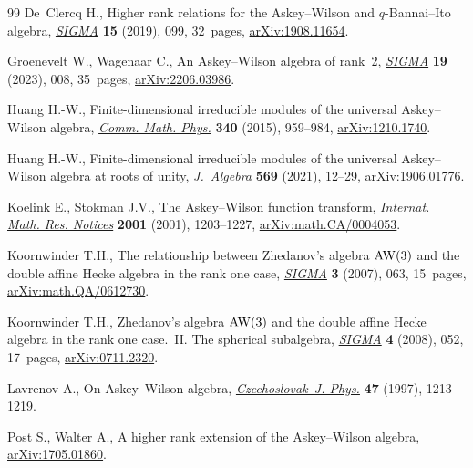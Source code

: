 \begin{thebibliography}{99}
De~Clercq H., Higher rank relations for the {A}skey--{W}ilson and
 {$q$}-{B}annai--{I}to algebra, \href{https://doi.org/10.3842/SIGMA.2019.099}{\textit{SIGMA}} \textbf{15} (2019), 099,
 32~pages, \href{https://arxiv.org/abs/1908.11654}{arXiv:1908.11654}.

Groenevelt W., Wagenaar C., An {A}skey--{W}ilson algebra of rank~2,
 \href{https://doi.org/10.3842/SIGMA.2023.008}{\textit{SIGMA}} \textbf{19} (2023), 008, 35~pages, \href{https://arxiv.org/abs/2206.03986}{arXiv:2206.03986}.

Huang H.-W., Finite-dimensional irreducible modules of the universal
 {A}skey--{W}ilson algebra, \href{https://doi.org/10.1007/s00220-015-2467-9}{\textit{Comm. Math. Phys.}} \textbf{340} (2015),
 959--984, \href{https://arxiv.org/abs/1210.1740}{arXiv:1210.1740}.

Huang H.-W., Finite-dimensional irreducible modules of the universal
 {A}skey--{W}ilson algebra at roots of unity, \href{https://doi.org/10.1016/j.jalgebra.2020.11.012}{\textit{J.~Algebra}} \textbf{569}
 (2021), 12--29, \href{https://arxiv.org/abs/1906.01776}{arXiv:1906.01776}.

Koelink E., Stokman J.V., The {A}skey--{W}ilson function transform,
 \href{https://doi.org/10.1155/S1073792801000575}{\textit{Internat. Math. Res. Notices}} \textbf{2001} (2001), 1203--1227,
 \href{https://arxiv.org/abs/math.CA/0004053}{arXiv:math.CA/0004053}.

Koornwinder T.H., The relationship between {Z}hedanov's algebra {${\rm AW}(3)$}
 and the double affine {H}ecke algebra in the rank one case, \href{https://doi.org/10.3842/SIGMA.2007.063}{\textit{SIGMA}}
 \textbf{3} (2007), 063, 15~pages, \href{https://arxiv.org/abs/math.QA/0612730}{arXiv:math.QA/0612730}.

Koornwinder T.H., Zhedanov's algebra {$\rm AW(3)$} and the double affine
 {H}ecke algebra in the rank one case.~{II}. {T}he spherical subalgebra,
 \href{https://doi.org/10.3842/SIGMA.2008.052}{\textit{SIGMA}} \textbf{4} (2008), 052, 17~pages, \href{https://arxiv.org/abs/0711.2320}{arXiv:0711.2320}.

Lavrenov A., On {A}skey--{W}ilson algebra, \href{https://doi.org/10.1023/A:1022821531517}{\textit{Czechoslovak~J. Phys.}}
 \textbf{47} (1997), 1213--1219.

Post S., Walter A., A higher rank extension of the {A}skey--{W}ilson algebra,
 \href{https://arxiv.org/abs/1705.01860}{arXiv:1705.01860}.


\end{thebibliography}
